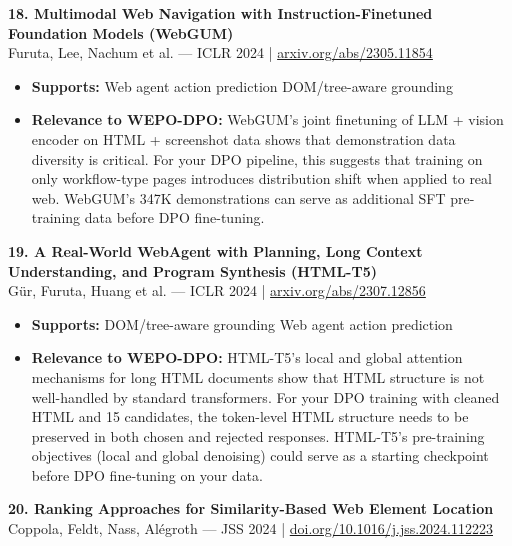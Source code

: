 \documentclass[pdflatex,sn-mathphys-num]{sn-jnl}
\theoremstyle{thmstyleone}
\theoremstyle{thmstyletwo}
\theoremstyle{thmstylethree}
\begin{document}
\textbf{18. Multimodal Web Navigation with Instruction-Finetuned Foundation Models (WebGUM)} \\
Furuta, Lee, Nachum et al. --- ICLR 2024 | \href{https://arxiv.org/abs/2305.11854}{arxiv.org/abs/2305.11854}

\begin{itemize}
    \item \textbf{Supports:} \checkmark Web agent action prediction \checkmark DOM/tree-aware grounding
    \item \textbf{Relevance to WEPO-DPO:} WebGUM's joint finetuning of LLM + vision encoder on HTML + screenshot data shows that demonstration data diversity is critical. For your DPO pipeline, this suggests that training on only workflow-type pages introduces distribution shift when applied to real web. WebGUM's 347K demonstrations can serve as additional SFT pre-training data before DPO fine-tuning.
\end{itemize}

\textbf{19. A Real-World WebAgent with Planning, Long Context Understanding, and Program Synthesis (HTML-T5)} \\
Gür, Furuta, Huang et al. --- ICLR 2024 | \href{https://arxiv.org/abs/2307.12856}{arxiv.org/abs/2307.12856}

\begin{itemize}
    \item \textbf{Supports:} \checkmark DOM/tree-aware grounding \checkmark Web agent action prediction
    \item \textbf{Relevance to WEPO-DPO:} HTML-T5's local and global attention mechanisms for long HTML documents show that HTML structure is not well-handled by standard transformers. For your DPO training with cleaned HTML and 15 candidates, the token-level HTML structure needs to be preserved in both chosen and rejected responses. HTML-T5's pre-training objectives (local and global denoising) could serve as a starting checkpoint before DPO fine-tuning on your data.
\end{itemize}

\textbf{20. Ranking Approaches for Similarity-Based Web Element Location} \\
Coppola, Feldt, Nass, Alégroth --- JSS 2024 | \href{https://linkinghub.elsevier.com/retrieve/pii/S0164121224003303}{doi.org/10.1016/j.jss.2024.112223}
\end{document}
